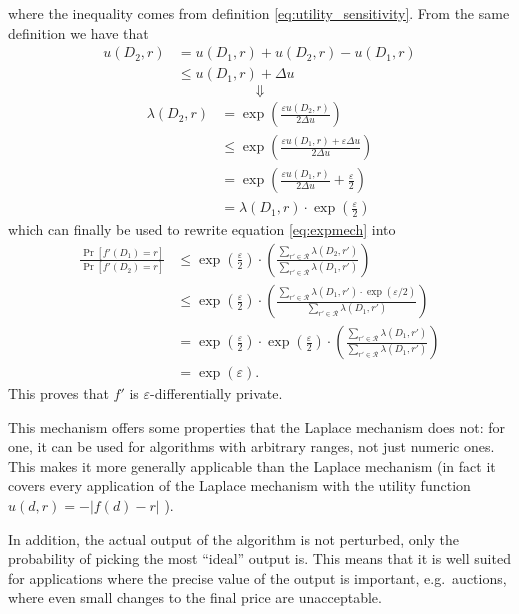 \documentclass[a4paper,12pt]{article}
\newcommand{\fancy}{\mathcal}
\renewcommand{\epsilon}{\varepsilon}
\begin{document}
where the inequality comes from definition \ref{eq:utility_sensitivity}. From the same definition we have that
\begin{align*}
    u(D_2,r) &= u(D_1,r) + u(D_2,r) - u(D_1,r) \\
        &\leq u(D_1,r) + \Delta u
\end{align*}
$$\Downarrow$$
\begin{align*}
    \lambda(D_2,r) &= \exp\left( \frac{\epsilon u(D_2,r)}{2\Delta u} \right) \\
        &\leq \exp\left( \frac{\epsilon u(D_1,r) + \epsilon\Delta u}{2\Delta u} \right) \\
        &= \exp\left( \frac{\epsilon u(D_1,r)}{2\Delta u} + \frac{\epsilon}{2} \right) \\
        &= \lambda(D_1,r) \cdot \exp \left( \frac{\epsilon}{2} \right)
\end{align*}
which can finally be used to rewrite equation \ref{eq:expmech} into
\begin{align*}
    \frac{\Pr[f'(D_1) = r]}{\Pr[f'(D_2) = r]} &\leq \exp \left( \frac{\epsilon}{2} \right) \cdot \left( \frac{\sum_{r'\in\fancy{R}} \lambda(D_2,r')}{\sum_{r'\in\fancy{R}} \lambda(D_1,r')} \right) \\
        &\leq \exp\left( \frac{\epsilon}{2} \right) \cdot \left( \frac{\sum_{r'\in\fancy{R}} \lambda(D_1,r')\cdot \exp(\epsilon/2)}{\sum_{r'\in\fancy{R}} \lambda(D_1,r')} \right) \\
        &= \exp\left( \frac{\epsilon}{2} \right) \cdot \exp\left( \frac{\epsilon}{2} \right) \cdot \left( \frac{\sum_{r'\in\fancy{R}} \lambda(D_1,r')}{\sum_{r'\in\fancy{R}} \lambda(D_1,r')} \right) \\
        &= \exp(\epsilon).
\end{align*}
This proves that $f'$ is $\epsilon$-differentially private. 

This mechanism offers some properties that the Laplace mechanism does not: for one, it can be used for algorithms with arbitrary ranges, not just numeric ones. This makes it more generally applicable than the Laplace mechanism (in fact it covers every application of the Laplace mechanism with the utility function $u(d,r)=-|f(d)-r|$ \cite{sherry_exponentialmech}).

In addition, the actual output of the algorithm is not perturbed, only the probability of picking the most ``ideal'' output is. This means that it is well suited for applications where the precise value of the output is important, e.g.\ auctions, where even small changes to the final price are unacceptable.
\end{document}
